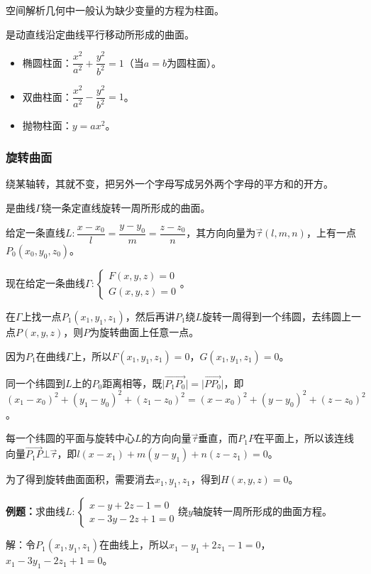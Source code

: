 \documentclass[UTF8, 12pt]{ctexart}
\begin{document}
空间解析几何中一般认为缺少变量的方程为柱面。

是动直线沿定曲线平行移动所形成的曲面。

\begin{itemize}
    \item 椭圆柱面：$\dfrac{x^2}{a^2}+\dfrac{y^2}{b^2}=1$（当$a=b$为圆柱面）。
    \item 双曲柱面：$\dfrac{x^2}{a^2}-\dfrac{y^2}{b^2}=1$。
    \item 抛物柱面：$y=ax^2$。
\end{itemize}

\subsubsection{旋转曲面}

绕某轴转，其就不变，把另外一个字母写成另外两个字母的平方和的开方。

是曲线$\varGamma$绕一条定直线旋转一周所形成的曲面。

给定一条直线$L:\dfrac{x-x_0}{l}=\dfrac{y-y_0}{m}=\dfrac{z-z_0}{n}$，其方向向量为$\vec{\tau}(l,m,n)$，上有一点$P_0(x_0,y_0,z_0)$。

现在给定一条曲线$\varGamma:\left\{\begin{array}{l}
    F(x,y,z)=0 \\
    G(x,y,z)=0
\end{array}\right.$。

在$\varGamma$上找一点$P_1(x_1,y_1,z_1)$，然后再讲$P_1$绕$L$旋转一周得到一个纬圆，去纬圆上一点$P(x,y,z)$，则$P$为旋转曲面上任意一点。

因为$P_1$在曲线$\varGamma$上，所以$F(x_1,y_1,z_1)=0$，$G(x_1,y_1,z_1)=0$。

同一个纬圆到$L$上的$P_0$距离相等，既$\vert\overrightarrow{P_1P_0}\vert=\vert\overrightarrow{PP_0}\vert$，即$(x_1-x_0)^2+(y_1-y_0)^2+(z_1-z_0)^2=(x-x_0)^2+(y-y_0)^2+(z-z_0)^2$。

每一个纬圆的平面与旋转中心$L$的方向向量$\vec{\tau}$垂直，而$P_1P$在平面上，所以该连线向量$\overrightarrow{P_1P}\bot\vec{\tau}$，即$l(x-x_1)+m(y-y_1)+n(z-z_1)=0$。

为了得到旋转曲面面积，需要消去$x_1,y_1,z_1$，得到$H(x,y,z)=0$。

\textbf{例题：}求曲线$L:\left\{\begin{array}{l}
    x-y+2z-1=0 \\
    x-3y-2z+1=0
\end{array}\right.$绕$y$轴旋转一周所形成的曲面方程。

解：令$P_1(x_1,y_1,z_1)$在曲线上，所以$x_1-y_1+2z_1-1=0$，$x_1-3y_1-2z_1+1=0$。
\end{document}
